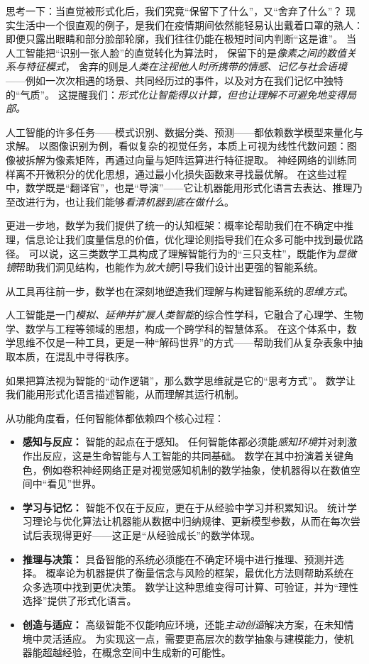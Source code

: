 思考一下：当直觉被形式化后，我们究竟“保留下了什么”，又“舍弃了什么”？  
现实生活中一个很直观的例子，是我们在疫情期间依然能轻易认出戴着口罩的熟人：即便只露出眼睛和部分脸部轮廓，我们往往仍能在极短时间内判断“这是谁”。  
当人工智能把“识别一张人脸”的直觉转化为算法时，  
保留下的是\emph{像素之间的数值关系与特征模式}，  
舍弃的则是\emph{人类在注视他人时所携带的情感、记忆与社会语境}——例如一次次相遇的场景、共同经历过的事件，以及对方在我们记忆中独特的“气质”。  
这提醒我们：\emph{形式化让智能得以计算，但也让理解不可避免地变得局部。}  

人工智能的许多任务——模式识别、数据分类、预测——都依赖数学模型来量化与求解。  
以图像识别为例，看似复杂的视觉任务，本质上可视为线性代数问题：图像被拆解为像素矩阵，再通过向量与矩阵运算进行特征提取。  
神经网络的训练同样离不开微积分的优化思想，通过最小化损失函数来寻找最优解。  
在这些过程中，数学既是“翻译官”，也是“导演”——它让机器能用形式化语言去表达、推理乃至改进行为，也让我们能够\emph{看清机器到底在做什么}。  

更进一步地，数学为我们提供了统一的认知框架：概率论帮助我们在不确定中推理，信息论让我们度量信息的价值，优化理论则指导我们在众多可能中找到最优路径。  
可以说，这三类数学工具构成了理解智能行为的“三只支柱”，既能作为\emph{显微镜}帮助我们洞见结构，也能作为\emph{放大镜}引导我们设计出更强的智能系统。  

从工具再往前一步，数学也在深刻地塑造我们理解与构建智能系统的\emph{思维方式}。  

人工智能是一门\emph{模拟、延伸并扩展人类智能}的综合性学科，它融合了心理学、生物学、数学与工程等领域的思想，构成一个跨学科的智慧体系。  
在这个体系中，数学思维不仅是一种工具，更是一种“解码世界”的方式——帮助我们从复杂表象中抽取本质，在混乱中寻得秩序。  

如果把算法视为智能的“动作逻辑”，那么数学思维就是它的“思考方式”。  
数学让我们能用形式化语言描述智能，从而理解其运行机制。  

从功能角度看，任何智能体都依赖四个核心过程：
\begin{itemize}
\item \textbf{感知与反应：} 智能的起点在于感知。  
任何智能体都必须能\emph{感知环境}并对刺激作出反应，这是生命智能与人工智能的共同基础。  
数学在其中扮演着关键角色，例如卷积神经网络正是对视觉感知机制的数学抽象，使机器得以在数值空间中“看见”世界。

\item \textbf{学习与记忆：} 智能不仅在于反应，更在于从经验中学习并积累知识。  
统计学习理论与优化算法让机器能从数据中归纳规律、更新模型参数，从而在每次尝试后表现得更好——这正是“从经验成长”的数学体现。

\item \textbf{推理与决策：} 具备智能的系统必须能在不确定环境中进行推理、预测并选择。  
概率论为机器提供了衡量信念与风险的框架，最优化方法则帮助系统在众多选项中找到更优决策。  
数学让这种思维变得可计算、可验证，并为“理性选择”提供了形式化语言。

\item \textbf{创造与适应：} 高级智能不仅能响应环境，还能\emph{主动创造}解决方案，在未知情境中灵活适应。  
为实现这一点，需要更高层次的数学抽象与建模能力，使机器能超越经验，在概念空间中生成新的可能性。
\end{itemize}

